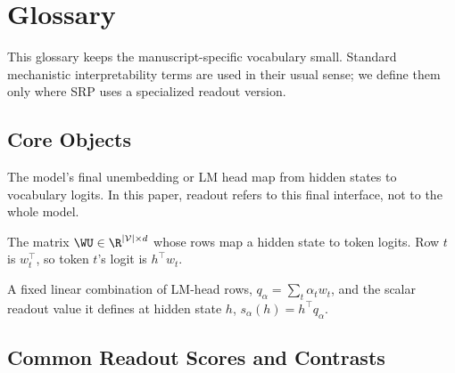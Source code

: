 \section{Glossary}
\label{app:glossary}

This glossary keeps the manuscript-specific vocabulary small. Standard
mechanistic interpretability terms are used in their usual sense; we define them
only where SRP uses a specialized readout version.

\subsection{Core Objects}

\begin{description}[leftmargin=0.28\linewidth,style=nextline]
    \item[Readout]
    The model's final unembedding or LM head map from hidden states to vocabulary
    logits. In this paper, readout refers to this final interface, not to the
    whole model.

    \item[Unembedding matrix, \(\WU\)]
    The matrix \(\WU\in\R^{|\mathcal{V}|\times d}\) whose rows map a hidden
    state to token logits. Row \(t\) is \(w_t^\top\), so token \(t\)'s logit is
    \(h^\top w_t\).

    \item[Selected readout direction and selected readout score]
    A fixed linear combination of LM-head rows,
    \(q_\alpha=\sum_t\alpha_t w_t\), and the scalar readout value it defines at
    hidden state \(h\), \(s_\alpha(h)=h^\top q_\alpha\).
\end{description}

\subsection{Common Readout Scores and Contrasts}

